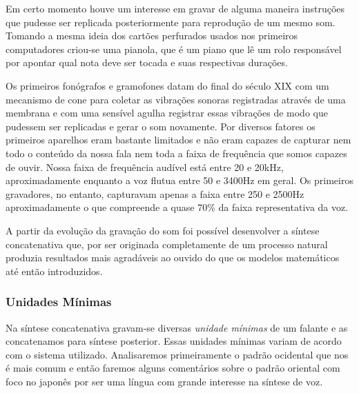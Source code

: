 Em certo momento houve um interesse em gravar de alguma maneira instruções que pudesse ser replicada posteriormente para reprodução de um mesmo som. Tomando a mesma ideia dos cartões perfurados usados nos primeiros computadores criou-se uma pianola, que é um piano que lê um rolo responsável por apontar qual nota deve ser tocada e suas respectivas durações. 

Os primeiros fonógrafos e gramofones datam do final do século XIX com um mecanismo de cone para coletar as vibrações sonoras registradas através de uma membrana e com uma sensível agulha registrar essas vibrações de modo que pudessem ser replicadas e gerar o som novamente. Por diversos fatores os primeiros aparelhos eram bastante limitados e não eram capazes de capturar nem todo o conteúdo da nossa fala nem toda a faixa de frequência que somos capazes de ouvir. Nossa faixa de frequência audível está entre 20 e 20kHz, aproximadamente enquanto a voz flutua entre 50 e 3400Hz em geral. Os primeiros gravadores, no entanto, capturavam apenas a faixa entre 250 e 2500Hz aproximadamente o que compreende a quase 70\% da faixa representativa da voz.

A partir da evolução da gravação do som foi possível desenvolver a síntese concatenativa que, por ser originada completamente de um processo natural produzia resultados mais agradáveis ao ouvido do que os modelos matemáticos até então introduzidos.

\subsubsection{Unidades Mínimas}
\label{subsection:unidades_minimas}

Na síntese concatenativa gravam-se diversas \emph{unidade mínimas} de um falante e as concatenamos para síntese posterior. Essas unidades mínimas variam de acordo com o sistema utilizado. Analisaremos primeiramente o padrão ocidental que nos é mais comum e então faremos alguns comentários sobre o padrão oriental com foco no japonês por ser uma língua com grande interesse na síntese de voz.

